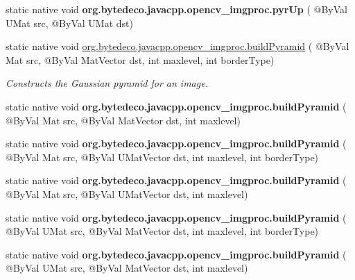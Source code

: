 \begin{DoxyCompactItemize}
\mbox{\label{group__imgproc__filter_ga2ef5bddb838547a49fedab3518de3da3}} 
static native void {\bfseries org.\+bytedeco.\+javacpp.\+opencv\+\_\+imgproc.\+pyr\+Up} ( @By\+Val U\+Mat src, @By\+Val U\+Mat dst)
\item 
static native void \hyperlink{group__imgproc__filter_ga418b215211fecb0c256c9db02d80dd0e}{org.\+bytedeco.\+javacpp.\+opencv\+\_\+imgproc.\+build\+Pyramid} ( @By\+Val Mat src, @By\+Val Mat\+Vector dst, int maxlevel, int border\+Type)
\begin{DoxyCompactList}\small\item\em Constructs the Gaussian pyramid for an image. \end{DoxyCompactList}\item 
\mbox{\label{group__imgproc__filter_ga17e294004abf5bf35e6ba1e8932d4068}} 
static native void {\bfseries org.\+bytedeco.\+javacpp.\+opencv\+\_\+imgproc.\+build\+Pyramid} ( @By\+Val Mat src, @By\+Val Mat\+Vector dst, int maxlevel)
\item 
\mbox{\label{group__imgproc__filter_ga06bef881b57f22d92ba76260f6726637}} 
static native void {\bfseries org.\+bytedeco.\+javacpp.\+opencv\+\_\+imgproc.\+build\+Pyramid} ( @By\+Val Mat src, @By\+Val U\+Mat\+Vector dst, int maxlevel, int border\+Type)
\item 
\mbox{\label{group__imgproc__filter_ga5bcefcff889f50651f9009cc9c277fea}} 
static native void {\bfseries org.\+bytedeco.\+javacpp.\+opencv\+\_\+imgproc.\+build\+Pyramid} ( @By\+Val Mat src, @By\+Val U\+Mat\+Vector dst, int maxlevel)
\item 
\mbox{\label{group__imgproc__filter_ga23df81c790fcf208aaf8100c12e982e4}} 
static native void {\bfseries org.\+bytedeco.\+javacpp.\+opencv\+\_\+imgproc.\+build\+Pyramid} ( @By\+Val U\+Mat src, @By\+Val Mat\+Vector dst, int maxlevel, int border\+Type)
\item 
\mbox{\label{group__imgproc__filter_ga0d03e58e45765e1a2c32da446782d85f}} 
static native void {\bfseries org.\+bytedeco.\+javacpp.\+opencv\+\_\+imgproc.\+build\+Pyramid} ( @By\+Val U\+Mat src, @By\+Val Mat\+Vector dst, int maxlevel)
\item 

\end{DoxyCompactItemize}
